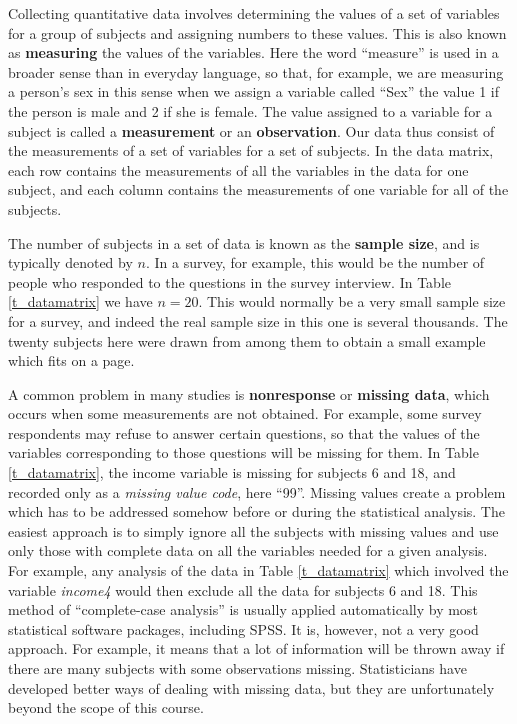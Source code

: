 Collecting quantitative data involves determining the values of a set of
variables for a group of subjects and assigning numbers to these values.
This is also known as \textbf{measuring} the values of the
variables. Here the word ``measure'' is used in a broader sense than in
everyday language, so that, for example, we are measuring a person's sex
in this sense when we assign a variable called ``Sex'' the value 1 if
the person is male and 2 if she is female. The value assigned to a
variable for a subject is called a \textbf{measurement} or an
\textbf{observation}. Our data thus consist of the measurements of a
set of variables for a set of subjects. In the data matrix, each row
contains the measurements of all the variables in the data for one
subject, and each column contains the measurements of one variable for
all of the subjects.

The number of subjects in a set of data is known as the \textbf{sample
size}, and is typically denoted by $n$. In a survey, for example,
this would be the number of people who responded to the questions in the
survey interview. In Table \ref{t_datamatrix} we have $n=20$. This would normally
be a very small sample size for a survey, and indeed the real
sample size in this one is several thousands. The twenty subjects here
were drawn from among them to obtain a small example which fits on a page.

A common problem in many studies is \textbf{nonresponse} or
\textbf{missing data}, which occurs when some measurements are not
obtained. For example, some survey respondents may refuse to answer
certain questions, so that the values of the variables corresponding to
those questions will be missing for them. In Table \ref{t_datamatrix},
the income variable is missing for subjects 6 and 18, and recorded only
as a \emph{missing value code}, here ``99''. Missing values create a
problem which has to be addressed somehow before or during the
statistical analysis. The easiest approach is to simply ignore all the
subjects with missing values and use only those with complete data on
all the variables needed for a given analysis.
For example, any analysis of the data in Table \ref{t_datamatrix} which
involved the variable \emph{income4} would then
exclude all the data for subjects 6 and 18. This method of
``complete-case analysis'' is usually applied
automatically by most statistical software packages, including SPSS. It
is, however, not a very good approach. For example, it means that a lot
of information will be thrown away if there are many subjects with some
observations missing. Statisticians have developed better ways of
dealing with missing data, but they are unfortunately beyond the scope
of this course.

